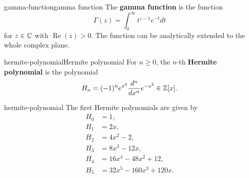 \begin{topic}{gamma-function}{gamma function}
    The \textbf{gamma function} is the function
    \[ \Gamma(z) = \int_0^\infty t^{z - 1} e^{-t} dt \]
    for $z \in \mathbb{C}$ with $\operatorname{Re}(z) > 0$. The function can be analytically extended to the whole complex plane.
\end{topic}

\begin{topic}{hermite-polynomial}{Hermite polynomial}
    For $n \ge 0$, the $n$-th \textbf{Hermite polynomial} is the polynomial
    \[ H_n = (-1)^{n} e^{x^2} \frac{d^n}{dx^n} e^{-x^2} \in \mathbb{Z}[x] . \]
\end{topic}

\begin{example}{hermite-polynomial}
    The first Hermite polynomials are given by
    \[ \begin{aligned}
        H_0 &= 1 , \\
        H_1 &= 2 x , \\
        H_2 &= 4 x^2 - 2 , \\
        H_3 &= 8 x^3 - 12 x , \\
        H_4 &= 16 x^4 - 48 x^2 + 12 , \\
        H_5 &= 32 x^5 - 160 x^3 + 120 x .
    \end{aligned} \]
\end{example}
